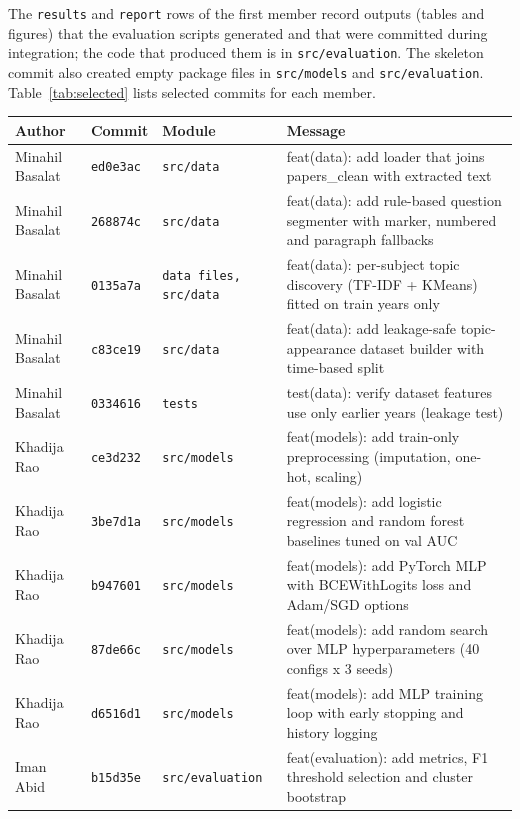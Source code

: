 \documentclass[11pt,a4paper]{article}
\begin{document}
The \texttt{results} and \texttt{report} rows of the first member record outputs (tables and figures) that the evaluation scripts
generated and that were committed during integration; the code that produced them is in \texttt{src/evaluation}. The
skeleton commit also created empty package files in \texttt{src/models} and \texttt{src/evaluation}. Table~\ref{tab:selected}
lists selected commits for each member.

\begin{table}[!htb]
\centering
\footnotesize
\begin{tabular}{llp{2.6cm}p{6.6cm}}
\toprule
Author & Commit & Module & Message \\
\midrule
Minahil Basalat & \texttt{ed0e3ac} & \texttt{src/data} & feat(data): add loader that joins papers\_clean with extracted text \\
Minahil Basalat & \texttt{268874c} & \texttt{src/data} & feat(data): add rule-based question segmenter with marker, numbered and paragraph fallbacks \\
Minahil Basalat & \texttt{0135a7a} & \texttt{data files, src/data} & feat(data): per-subject topic discovery (TF-IDF + KMeans) fitted on train years only \\
Minahil Basalat & \texttt{c83ce19} & \texttt{src/data} & feat(data): add leakage-safe topic-appearance dataset builder with time-based split \\
Minahil Basalat & \texttt{0334616} & \texttt{tests} & test(data): verify dataset features use only earlier years (leakage test) \\
Khadija Rao & \texttt{ce3d232} & \texttt{src/models} & feat(models): add train-only preprocessing (imputation, one-hot, scaling) \\
Khadija Rao & \texttt{3be7d1a} & \texttt{src/models} & feat(models): add logistic regression and random forest baselines tuned on val AUC \\
Khadija Rao & \texttt{b947601} & \texttt{src/models} & feat(models): add PyTorch MLP with BCEWithLogits loss and Adam/SGD options \\
Khadija Rao & \texttt{87de66c} & \texttt{src/models} & feat(models): add random search over MLP hyperparameters (40 configs x 3 seeds) \\
Khadija Rao & \texttt{d6516d1} & \texttt{src/models} & feat(models): add MLP training loop with early stopping and history logging \\
Iman Abid & \texttt{b15d35e} & \texttt{src/evaluation} & feat(evaluation): add metrics, F1 threshold selection and cluster bootstrap \\

\end{tabular}
\end{table}
\end{document}
